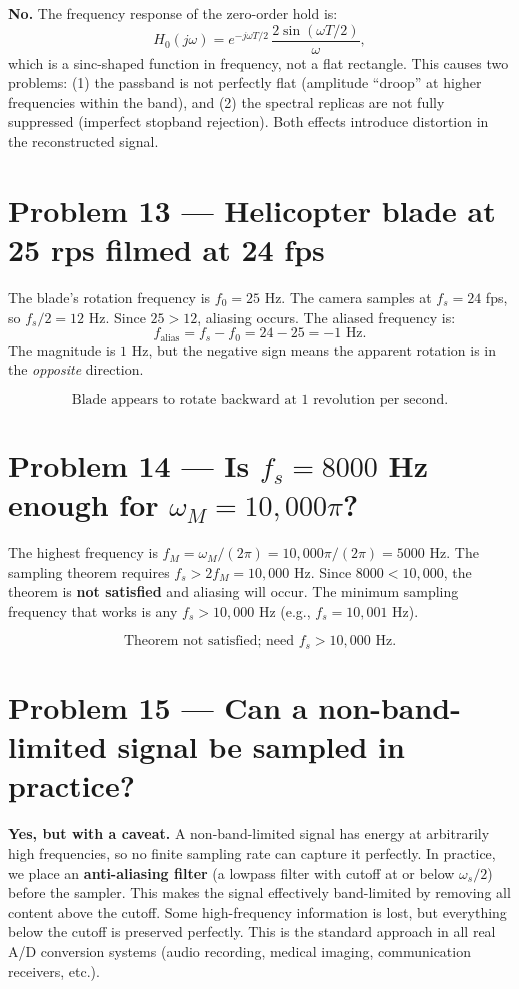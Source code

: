 \documentclass[11pt]{article}
\newcommand{\boxans}[1]{\[\boxed{#1}\]}
\begin{document}
\textbf{No.} The frequency response of the zero-order hold is:
\[
H_0(j\omega) = e^{-j\omega T/2}\,\frac{2\sin(\omega T/2)}{\omega},
\]
which is a sinc-shaped function in frequency, not a flat rectangle. This causes two problems: (1) the passband is not perfectly flat (amplitude ``droop'' at higher frequencies within the band), and (2) the spectral replicas are not fully suppressed (imperfect stopband rejection). Both effects introduce distortion in the reconstructed signal.

\section*{Problem 13 --- Helicopter blade at 25 rps filmed at 24 fps}

The blade's rotation frequency is $f_0 = 25$ Hz. The camera samples at $f_s = 24$ fps, so $f_s/2 = 12$ Hz. Since $25 > 12$, aliasing occurs. The aliased frequency is:
\[
f_{\text{alias}} = f_s - f_0 = 24 - 25 = -1 \text{ Hz}.
\]
The magnitude is $1$ Hz, but the negative sign means the apparent rotation is in the \emph{opposite} direction.

\boxans{\text{Blade appears to rotate backward at 1 revolution per second.}}

\section*{Problem 14 --- Is \texorpdfstring{$f_s = 8000$}{fs = 8000} Hz enough for \texorpdfstring{$\omega_M = 10{,}000\pi$}{omega\_M = 10000 pi}?}

The highest frequency is $f_M = \omega_M/(2\pi) = 10{,}000\pi/(2\pi) = 5000$ Hz. The sampling theorem requires $f_s > 2f_M = 10{,}000$ Hz. Since $8000 < 10{,}000$, the theorem is \textbf{not satisfied} and aliasing will occur. The minimum sampling frequency that works is any $f_s > 10{,}000$ Hz (e.g., $f_s = 10{,}001$ Hz).

\boxans{\text{Theorem not satisfied; need } f_s > 10{,}000 \text{ Hz.}}

\section*{Problem 15 --- Can a non-band-limited signal be sampled in practice?}

\textbf{Yes, but with a caveat.} A non-band-limited signal has energy at arbitrarily high frequencies, so no finite sampling rate can capture it perfectly. In practice, we place an \textbf{anti-aliasing filter} (a lowpass filter with cutoff at or below $\omega_s/2$) before the sampler. This makes the signal effectively band-limited by removing all content above the cutoff. Some high-frequency information is lost, but everything below the cutoff is preserved perfectly. This is the standard approach in all real A/D conversion systems (audio recording, medical imaging, communication receivers, etc.).
\end{document}
